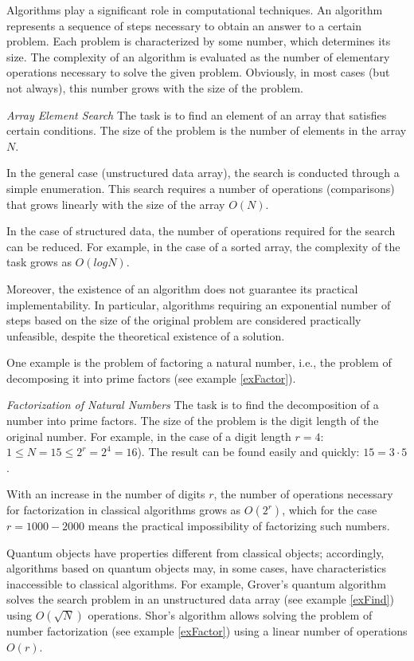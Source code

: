 Algorithms play a significant role in computational techniques. An algorithm represents a sequence of steps necessary to obtain an answer to a certain problem. Each problem is characterized by some number, which determines its size. The complexity of an algorithm is evaluated as the number of elementary operations necessary to solve the given problem. Obviously, in most cases (but not always), this number grows with the size of the problem.

\begin{example}
\emph{Array Element Search}
\label{exFind}
The task is to find an element of an array that satisfies certain conditions. The size of the problem is the number of elements in the array $N$.

In the general case (unstructured data array), the search is conducted through a simple enumeration. This search requires a number of operations (comparisons) that grows linearly with the size of the array $O\left( N \right)$.

In the case of structured data, the number of operations required for the search can be reduced. For example, in the case of a sorted array, the complexity of the task grows as $O\left(log N\right)$.
\end{example}

Moreover, the existence of an algorithm does not guarantee its practical implementability. In particular, algorithms requiring an exponential number of steps based on the size of the original problem are considered practically unfeasible, despite the theoretical existence of a solution.

One example is the problem of factoring a natural number, i.e., the problem of decomposing it into prime factors (see example \ref{exFactor}).

\begin{example}
\emph{Factorization of Natural Numbers}
\label{exFactor}
The task is to find the decomposition of a number into prime factors. The size of the problem is the digit length of the original number. For example, in the case of a digit length $r = 4$: $1 \le N = 15 \le 2^r = 2^4 = 16$). The result can be found easily and quickly: $15 = 3 \cdot 5$.

With an increase in the number of digits $r$, the number of operations necessary for factorization in classical algorithms grows as $O\left(2^r\right)$, which for the case $r = 1000 - 2000$ means the practical impossibility of factorizing such numbers.
\end{example}

Quantum objects have properties different from classical objects; accordingly, algorithms based on quantum objects may, in some cases, have characteristics inaccessible to classical algorithms. For example, Grover's quantum algorithm \cite{Grover96afast} solves the search problem in an unstructured data array (see example \ref{exFind}) using $O\left(\sqrt{N}\right)$ operations. Shor's algorithm \cite{bShor94} allows solving the problem of number factorization (see example \ref{exFactor}) using a linear number of operations $O\left(r\right)$. 